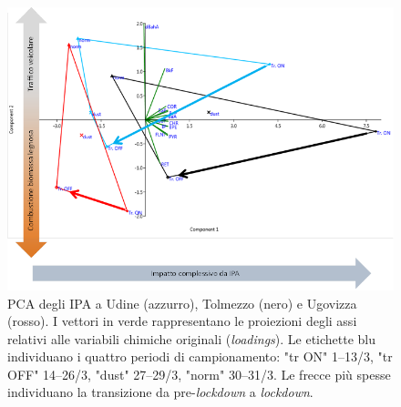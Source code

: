 \begin{landscape}
\begin{figure}
    \centering
    \includegraphics[width=0.9\linewidth]{figs/ipa-pca.png}
    \caption[PCA degli IPA a Udine, Tolmezzo e Ugovizza]{PCA degli IPA a Udine (azzurro), Tolmezzo (nero) e Ugovizza (rosso). I vettori in verde rappresentano le proiezioni degli assi relativi alle variabili chimiche originali (\textit{loadings}). Le etichette blu individuano i quattro periodi di campionamento: "tr ON" 1--13/3, "tr OFF" 14--26/3, "dust" 27--29/3, "norm" 30--31/3. Le frecce più spesse individuano la transizione da pre-\textit{lockdown} a \textit{lockdown}.}
    \label{fig:ipa1}
\end{figure}
\end{landscape}
